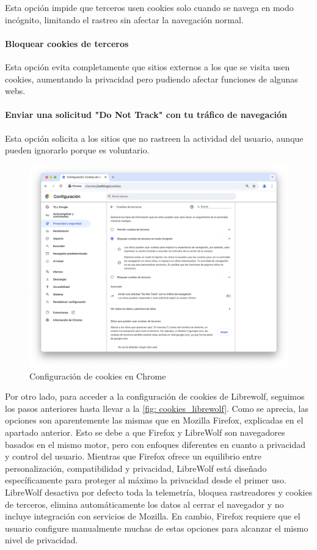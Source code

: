 Esta opción impide que terceros usen cookies solo cuando se navega en modo incógnito, limitando el rastreo sin afectar la navegación normal. 

\paragraph{Bloquear cookies de terceros}

Esta opción evita completamente que sitios externos a los que se visita usen cookies, aumentando la privacidad pero pudiendo afectar funciones de algunas webs. 

\paragraph{Enviar una solicitud "Do Not Track" con tu tráfico de navegación }

Esta opción solicita a los sitios que no rastreen la actividad del usuario, aunque pueden ignorarlo porque es voluntario. 

\begin{figure}[H]   
    \includegraphics[width=15cm]{cookies_chrome_ej14a.png}
    \caption{Configuración de cookies en Chrome}
    \label{fig:cookies_chrome}
\end{figure}

Por otro lado, para acceder a la configuración de cookies de Librewolf, seguimos los pasos anteriores hasta llevar a la \ref{fig: cookies_librewolf}. Como se aprecia, las opciones son aparentemente las mismas que en Mozilla Firefox, explicadas en el apartado anterior. Esto se debe a que Firefox y LibreWolf son navegadores basados en el mismo motor, pero con enfoques diferentes en cuanto a privacidad y control del usuario. Mientras que Firefox ofrece un equilibrio entre personalización, compatibilidad y privacidad, LibreWolf está diseñado específicamente para proteger al máximo la privacidad desde el primer uso. LibreWolf desactiva por defecto toda la telemetría, bloquea rastreadores y cookies de terceros, elimina automáticamente los datos al cerrar el navegador y no incluye integración con servicios de Mozilla. En cambio, Firefox requiere que el usuario configure manualmente muchas de estas opciones para alcanzar el mismo nivel de privacidad. 

